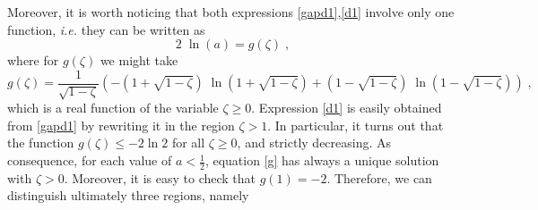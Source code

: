 Moreover, it is worth noticing that both expressions \eqref{gapd1},\eqref{d1} involve only one function, {\it i.e.} they can be written as
\begin{equation}
2 \; \ln(a) = g(\zeta)  \;, \label{g}
\end{equation}
where for $g(\zeta)$ we might take
\begin{equation}
g(\zeta) =    \frac{1}{ \sqrt{1-\zeta}} \left(
- \left( 1 +  \sqrt{1-\zeta} \right) \; \ln\left( 1 +  \sqrt{1-\zeta} \right) +  \left( 1 -  \sqrt{1-\zeta} \right) \; \ln\left( 1 - \sqrt{1-\zeta} \right)  \right) \;,
\label{gex}
\end{equation}
which is a real function of the variable $\zeta \ge 0$. Expression \eqref{d1} is easily obtained from \eqref{gapd1} by rewriting it in the region $\zeta>1$.  In particular, it turns out that the function $g(\zeta)\leq -2\ln 2$ for all $\zeta \ge 0$, and strictly decreasing. As consequence, for each value of $a<\frac{1}{2}$, equation \eqref{g} has always a unique solution with $\zeta>0$.  Moreover, it is easy to check that $g(1)=-2$. Therefore,  we can distinguish ultimately three regions, namely
